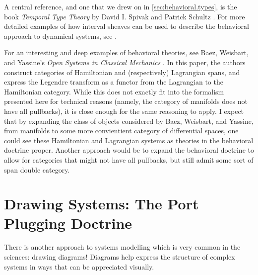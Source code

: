 \documentclass[DynamicalBook]{subfiles}
\begin{document}
A central reference, and one that we drew on in \cref{sec:behavioral.types}, is the book \emph{Temporal Type Theory} by David I. Spivak and Patrick Schultz \cite{schultz2019temporal}. For more detailed examples of how interval sheaves can be used to describe the behavioral approach to dynamical systems, see \cite{schultz2016dynamical}.

For an interesting and deep examples of behavioral theories, see Baez, Weisbart, and Yassine's \emph{Open Systems in Classical Mechanics} \cite{Baez-Weisbart-Yassine:Open.Systems}. In this paper, the authors construct categories of Hamiltonian and (respectively) Lagrangian spans, and express the Legendre transform as a functor from the Lagrangian to the Hamiltonian category. While this does not exactly fit into the formalism presented here for technical reasons (namely, the category of manifolds does not have all pullbacks), it is close enough for the same reasoning to apply. I expect that by expanding the class of objects considered by Baez, Weisbart, and Yassine, from manifolds to some more convientient category of differential spaces, one could see these Hamiltonian and Lagrangian systems as theories in the behavioral doctrine proper. Another approach would be to expand the behavioral doctrine to allow for categories that might not have all pullbacks, but still admit some sort of span double category.



\section{Drawing Systems: The Port Plugging Doctrine}\label{sec:diagram.approach}

There is another approach to systems modelling which is very common in the sciences: drawing diagrams! Diagrams help express the structure of complex systems in ways that can be appreciated visually.
\end{document}
